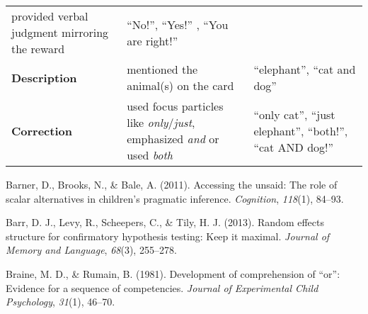 \documentclass[,man,floatsintext]{apa6}
\begin{document}
\begin{longtable}[]{@{}lll@{}}
\begin{minipage}[t]{0.46\columnwidth}
provided verbal judgment mirroring the reward\strut
\end{minipage} & \begin{minipage}[t]{0.31\columnwidth}\raggedright
\enquote{No!}, \enquote{Yes!} , \enquote{You are right!}\strut
\end{minipage}\tabularnewline
\begin{minipage}[t]{0.14\columnwidth}\raggedright
\textbf{Description}\strut
\end{minipage} & \begin{minipage}[t]{0.46\columnwidth}\raggedright
mentioned the animal(s) on the card\strut
\end{minipage} & \begin{minipage}[t]{0.31\columnwidth}\raggedright
\enquote{elephant}, \enquote{cat and dog}\strut
\end{minipage}\tabularnewline
\begin{minipage}[t]{0.14\columnwidth}\raggedright
\textbf{Correction}\strut
\end{minipage} & \begin{minipage}[t]{0.46\columnwidth}\raggedright
used focus particles like \emph{only}/\emph{just}, emphasized \emph{and} or used \emph{both}\strut
\end{minipage} & \begin{minipage}[t]{0.31\columnwidth}\raggedright
\enquote{only cat}, \enquote{just elephant}, \enquote{both!}, \enquote{cat AND dog!}\strut
\end{minipage}\tabularnewline
\bottomrule
\end{longtable}

\setlength{\parindent}{-0.5in}
\setlength{\leftskip}{0.5in}

\hypertarget{refs}{}
\leavevmode\hypertarget{ref-barner2011accessing}{}%
Barner, D., Brooks, N., \& Bale, A. (2011). Accessing the unsaid: The role of scalar alternatives in children's pragmatic inference. \emph{Cognition}, \emph{118}(1), 84--93.

\leavevmode\hypertarget{ref-barr2013random}{}%
Barr, D. J., Levy, R., Scheepers, C., \& Tily, H. J. (2013). Random effects structure for confirmatory hypothesis testing: Keep it maximal. \emph{Journal of Memory and Language}, \emph{68}(3), 255--278.

\leavevmode\hypertarget{ref-braine1981development}{}%
Braine, M. D., \& Rumain, B. (1981). Development of comprehension of ``or'': Evidence for a sequence of competencies. \emph{Journal of Experimental Child Psychology}, \emph{31}(1), 46--70.
\end{document}
